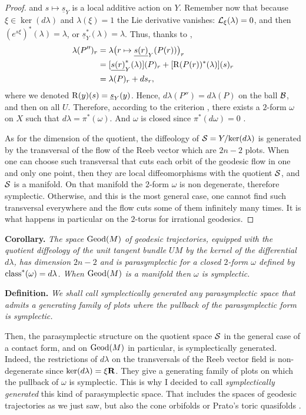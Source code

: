 \begin{proof}
  and $s \mapsto \underline{s}_Y$ is a local additive action on $Y$.
  Remember now that because $\xi \in \ker(d\lambda)$ and $\lambda(\xi) = 1$ the Lie derivative vanishes: $\mathcal{L}_\xi(\lambda)= 0$,
  and then $(e^{s\xi})^*(\lambda) = \lambda$,
  or $\underline{s}_Y^*(\lambda) = \lambda$.
  Thus,
  thanks to \cite[]{PIZ13},
  \begin{align*}
    \lambda(P'')_r & = \lambda\big(r \mapsto \underline{s(r)}_Y(P(r))\big)_r \\
    & = [\underline{s(r)}_Y^*(\lambda)](P)_r + [\operatorname{R}(P(r))^*(\lambda)](s)_r  \\
    & = \lambda(P)_r + ds_r,
  \end{align*}
  where we denoted $\operatorname{R}(y)(s) = \underline{s}_Y(y)$.
  Hence,
  $d\lambda(P'') = d\lambda(P)$ on the ball $\mathcal{B}$,
  and then on all $U$.
  Therefore,
  according to the criterion \cite[]{PIZ13},
  there exists a $2$-form $\omega$ on $X$ such that $d\lambda = \pi^*(\omega)$.
  And $\omega$ is closed since $\pi^*(d\omega) = 0$ \cite[]{PIZ13}.
  
  As for the dimension of the quotient,
  the diffeology of $\mathcal{S} = Y/\mathrm{ker}(d\lambda)$ is generated by the transversal of the flow of the Reeb vector which are $2n-2$ plots.
  When one can choose such transversal that cuts each orbit of the geodesic flow in one and only one point,
  then they are local diffeomorphisms with the quotient $\mathcal{S}$,
  and $\mathcal{S}$ is a manifold.
  On that manifold the $2$-form $\omega$ is non degenerate,
  therefore symplectic.
  Otherwise,
  and this is the most general case,
  one cannot find such transversal everywhere and the flow cuts some of them infinitely many times.
  It is what happens in particular on the $2$-torus for irrational geodesics.
\end{proof}

\textbf{Corollary.} {\it The space $\operatorname{Geod}(M)$ of geodesic trajectories,
equipped with the quotient diffeology of the unit tangent bundle $UM$ by the kernel of the differential $d\lambda$,
has dimension $2n-2$ and is parasymplectic for a closed $2$-form $\omega$ defined by $\operatorname{class}^*(\omega) = d\lambda$.
When $\operatorname{Geod}(M)$ is a manifold then $\omega$ is symplectic.
}

\textbf{Definition.} {\it We shall call \emph{symplectically generated} any parasymplectic space that admits a generating family of plots where the pullback of the parasymplectic form is symplectic.}

Then,
the parasymplectic structure on the quotient space $\mathcal{S}$ in the general case of a contact form,
and on $\operatorname{Geod}(M)$ in particular,
is symplectically generated.
Indeed,
the restrictions of $d\lambda$ on the transversals of the Reeb vector field is non-degenerate since $\mathrm{ker}(d\lambda) = \xi\mathbf{R}$.
They give a generating family of plots on which the pullback of $\omega$ is symplectic.
This is why I decided to call \emph{symplectically generated} this kind of parasymplectic space.
That includes the spaces of geodesic trajectories as we just saw,
but also the cone orbifolds \cite[]{PIZ13} or Prato's toric quasifolds \cite{EP01}.

